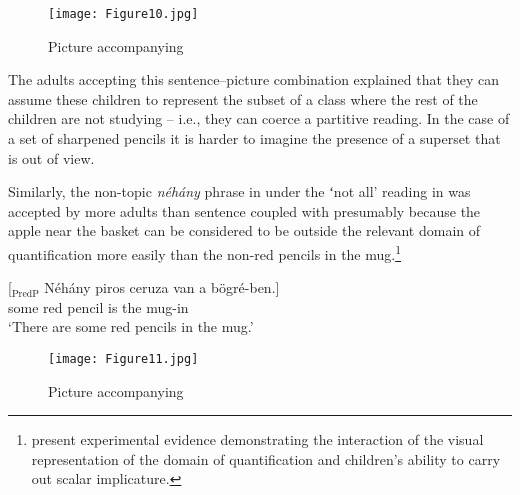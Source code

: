 \documentclass[output=paper]{langscibook}
\begin{document}
\begin{figure}
    \centering
    \texttt{[image: Figure10.jpg]}
    \caption{Picture accompanying }
    \label{kis-zet:children reading}
\end{figure}

The adults accepting this sentence–picture combination explained that they can assume these children to represent the subset of a class where the rest of the children are not studying – i.e., they can coerce a partitive reading. In the case of a set of sharpened pencils it is harder to imagine the presence of a superset that is out of view. 

Similarly, the non-topic \textit{néhány} phrase in  under the ʻnot all’ reading in  was accepted by more adults than sentence  coupled with  presumably because the apple near the basket can be considered to be outside the relevant domain of quantification more easily than the non-red pencils in the mug.\footnote{\citet{ekisszt18} present experimental evidence demonstrating the interaction of the visual representation of the domain of quantification and children’s ability to carry out scalar implicature.} 

\ea
\gll \label{kis-zet:piros ceruza}[$_\text{PredP}$ Néhány piros ceruza van a bögré-ben.]\\  
    {} some red pencil is the mug-in \\ 
\glt ‘There are some red pencils in the mug.’
\z

\vspace{-3.0ex}

\begin{figure}
    \centering
    \texttt{[image: Figure11.jpg]}
\vspace{-2.0ex}
    \caption{Picture accompanying }
    \label{kis-zet:pencils}
\end{figure}
\end{document}
